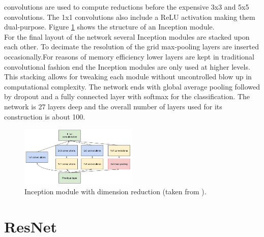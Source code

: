 \documentclass[11pt]{report}
\begin{document}
convolutions are used to compute reductions before the expensive 3x3 and 5x5
convolutions. The 1x1 convolutions also include a ReLU activation making them
dual-purpose. Figure \ref{InceptionModule} shows the structure of an Inception
module. \\
For the final layout of the network several Inception modules are stacked
upon each other. To decimate the resolution of the grid max-pooling layers are
inserted occasionally.For reasons of memory efficiency lower layers are kept in
traditional convolutional fashion end the Inception modules are only used at
higher levels. This stacking allows for tweaking each module without
uncontrolled blow up in computational complexity. The network ends with global
average pooling followed by dropout and a fully connected layer with softmax for the
classification. The network is 27 layers deep and the overall number of layers
used for its construction is about 100.
\begin{figure}
  \centering
  \includegraphics[width=0.5\textwidth]{InceptionModule}
  \caption{Inception module with dimension reduction (taken from \cite{szegedy2015going}).}
  \label{InceptionModule}
\end{figure}

\section{ResNet}
\end{document}
